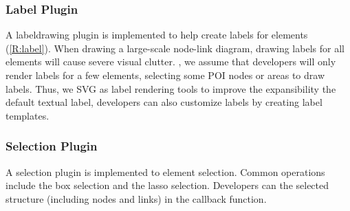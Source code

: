 \subsubsection{Label Plugin}

    A label\replaced[id=kg]{-}{ }drawing plugin is implemented to help create labels for elements (\ref{R:label}). When drawing a large-scale node-link diagram, drawing labels for all elements will cause severe visual clutter. 
    , we assume that developers will only render labels for a few elements,  selecting some POI nodes or areas to draw labels. Thus, we  SVG as label rendering tools to improve the expansibility  the default textual label, developers can also customize labels by creating label templates.

\subsubsection{Selection Plugin}

    A selection plugin is implemented to  element selection. Common operations include the box selection and the lasso selection. Developers can  the selected structure (including nodes and links) in the callback function.




